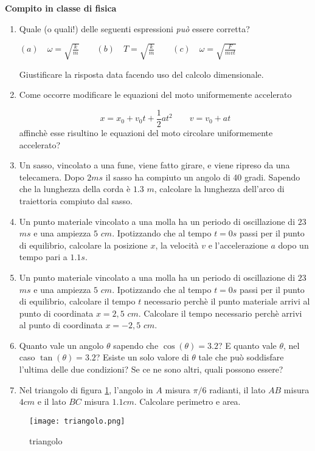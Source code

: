 \documentclass[14pt]{extarticle}
\begin{document}


\begin{center}
{\bf Compito in classe di fisica}
\end{center}

\begin{enumerate}
	\item Quale (o quali!) delle seguenti espressioni \emph{può} essere corretta?
	
		$(a)\quad\omega = \sqrt{\frac{k}{m}}
		\qquad (b)\quad T = \sqrt{\frac{k}{m}}
		\qquad (c)\quad \omega = \sqrt{\frac{F}{mvt}}$
			 
		Giustificare la risposta data facendo uso del calcolo dimensionale.
		
	\item Come occorre modificare le equazioni del moto uniformemente accelerato
	
	$$
		x = x_0 + v_0t +\frac{1}{2}at^2\qquad
		v = v_0 + at
	$$
	affinchè esse risultino le equazioni del moto circolare uniformemente accelerato?
	
	\item Un sasso, vincolato a una fune, viene fatto girare, e viene ripreso da una telecamera. Dopo $2ms$ il sasso ha compiuto un angolo di 40 gradi. Sapendo che la lunghezza della corda è $1.3$ $m$, calcolare la lunghezza dell'arco di traiettoria compiuto dal sasso.
	
	\item Un punto materiale vincolato a una molla ha un periodo di oscillazione di $23$ $ms$ e una ampiezza $5$ $cm$. Ipotizzando che al tempo $t = 0s$ passi per il punto di equilibrio, calcolare la posizione $x$, la velocità $v$ e l'accelerazione $a$ dopo un tempo pari a $1.1s$.

	\item Un punto materiale vincolato a una molla ha un periodo di oscillazione di $23$ $ms$ e una ampiezza $5$ $cm$. Ipotizzando che al tempo $t = 0s$ passi per il punto di equilibrio, calcolare il tempo $t$ necessario perchè il punto materiale arrivi al punto di coordinata $x = 2,5$ $cm$. Calcolare il tempo necessario perchè arrivi al punto di coordinata $x = -2,5$ $cm$.
	
	\item Quanto vale un angolo $\theta$ sapendo che $\cos(\theta) = 3.2$? E quanto vale $\theta$, nel caso $\tan(\theta) = 3.2$? Esiste un solo valore di $\theta$ tale che può soddisfare l'ultima delle due condizioni? Se ce ne sono altri, quali possono essere?

	\item Nel triangolo di figura \ref{fig:triangolo}, l'angolo in $A$ misura $\pi/6$ radianti, il lato $AB$ misura $4cm$ e il lato $BC$ misura $1.1cm$. Calcolare perimetro e area.
\end{enumerate}

\begin{figure}[h!]		
	\centering
   	\texttt{[image: triangolo.png]}
  	\caption{triangolo}
   	\label{fig:triangolo}
\end{figure}
\end{document}
